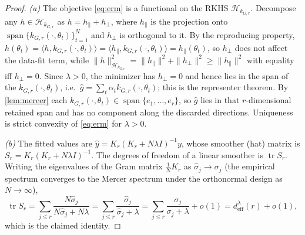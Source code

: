 \documentclass[aps,prxquantum,reprint,amsmath,amssymb,floatfix,nofootinbib,superscriptaddress,longbibliography]{revtex4-2}
\theoremstyle{remark}
\begin{document}
\begin{proof}
\emph{(a)} The objective \eqref{eq:erm} is a functional on the RKHS
\(\mathcal H_{k_{G,r}}\).  Decompose any \(h\in\mathcal H_{k_{G,r}}\) as
\(h=h_{\parallel}+h_{\perp}\), where \(h_{\parallel}\) is the projection onto
\(\operatorname{span}\{k_{G,r}(\cdot,\theta_t)\}_{t=1}^{N}\) and \(h_\perp\) is
orthogonal to it.  By the reproducing property,
\(h(\theta_t)=\langle h,k_{G,r}(\cdot,\theta_t)\rangle
=\langle h_\parallel,k_{G,r}(\cdot,\theta_t)\rangle=h_\parallel(\theta_t)\), so
\(h_\perp\) does not affect the data-fit term, while
\(\|h\|_{\mathcal H_{k_{G,r}}}^2=\|h_\parallel\|^2+\|h_\perp\|^2\ge
\|h_\parallel\|^2\) with equality iff \(h_\perp=0\).  Since \(\lambda>0\), the
minimizer has \(h_\perp=0\) and hence lies in the span of the
\(k_{G,r}(\cdot,\theta_t)\), i.e.\ \(\widehat g=\sum_t\alpha_t k_{G,r}
(\cdot,\theta_t)\); this is the representer theorem.  By \cref{lem:mercer} each
\(k_{G,r}(\cdot,\theta_t)\in\operatorname{span}\{e_1,\dots,e_r\}\), so
\(\widehat g\) lies in that \(r\)-dimensional retained span and has no component
along the discarded directions.  Uniqueness is strict convexity of
\eqref{eq:erm} for \(\lambda>0\).

\emph{(b)} The fitted values are \(\widehat y=K_r(K_r+N\lambda I)^{-1}y\), whose
smoother (hat) matrix is \(S_r=K_r(K_r+N\lambda I)^{-1}\).  The degrees of freedom
of a linear smoother is \(\operatorname{tr}S_r\).  Writing the eigenvalues of the
Gram matrix \(\tfrac1N K_r\) as \(\widehat\sigma_j\to\sigma_j\) (the empirical
spectrum converges to the Mercer spectrum under the orthonormal design as
\(N\to\infty\)),
\[
    \operatorname{tr}S_r
    =\sum_{j\le r}\frac{N\widehat\sigma_j}{N\widehat\sigma_j+N\lambda}
    =\sum_{j\le r}\frac{\widehat\sigma_j}{\widehat\sigma_j+\lambda}
    =\sum_{j\le r}\frac{\sigma_j}{\sigma_j+\lambda}+o(1)
    =d_{\mathrm{eff}}^{\lambda}(r)+o(1),
\]
which is the claimed identity.


\end{proof}
\end{document}
